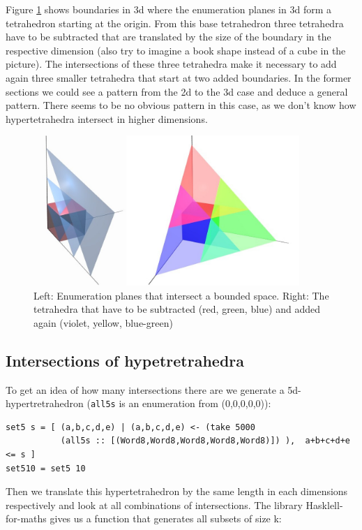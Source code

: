 \documentclass{tmr}
\begin{document}
Figure \ref{enum3bounded} shows boundaries in 3d where the enumeration planes in 3d form a tetrahedron starting at the origin. From this base tetrahedron three tetrahedra have to be subtracted that are translated by the size of the boundary in the respective dimension (also try to imagine a book shape instead of a cube in the picture). The intersections of these three tetrahedra make it necessary to add again three smaller tetrahedra that start at two added boundaries. In the former sections we could see a pattern from the 2d to the 3d case and deduce a general pattern. There seems to be no obvious pattern in this case, as we don't know how hypertetrahedra intersect in higher dimensions.

\begin{figure}[htbp]
  \centering
    \includegraphics[width=0.9\textwidth]{planes.jpg}
    \caption{Left: Enumeration planes that intersect a bounded space. Right: The tetrahedra that have to be subtracted (red, green, blue) and added again (violet, yellow, blue-green) }
  \label{enum3bounded}
\end{figure}

\subsection{Intersections of hypetretrahedra}
To get an idea of how many intersections there are we generate a 5d-hypertretrahedron (\verb|all5s| is an enumeration from (0,0,0,0,0)):

\begin{Verbatim}
set5 s = [ (a,b,c,d,e) | (a,b,c,d,e) <- (take 5000 
           (all5s :: [(Word8,Word8,Word8,Word8,Word8)]) ),  a+b+c+d+e <= s ]
set510 = set5 10
\end{Verbatim}

Then we translate this hypertetrahedron by the same length in each dimensions respectively and look at all combinations of intersections.
The library Hasklell-for-maths gives us a function that generates all subsets of size k:
\end{document}
